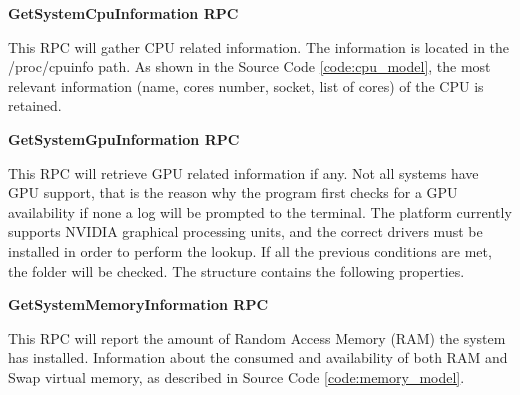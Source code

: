         
        \textbf{GetSystemCpuInformation RPC}
        
        This RPC will gather CPU related information. The information is located in the /proc/cpuinfo path. As shown in the Source Code \ref{code:cpu_model}, the most relevant information (name, cores number, socket, list of cores) of the CPU is retained.
        
        
        \textbf{GetSystemGpuInformation RPC}
        
        This RPC will retrieve GPU related information if any. Not all systems have GPU support, that is the reason why the program first checks for a GPU availability if none a log will be prompted to the terminal. The platform currently supports NVIDIA graphical processing units, and the correct drivers must be installed in order to perform the lookup. If all the previous conditions are met, the folder will be checked. The structure contains the following properties.
        
        
        \textbf{GetSystemMemoryInformation RPC}
        
        This RPC will report the amount of Random Access Memory (RAM) the system has installed. Information about the consumed and availability of both RAM and Swap virtual memory, as described in Source Code \ref{code:memory_model}.
        
        
